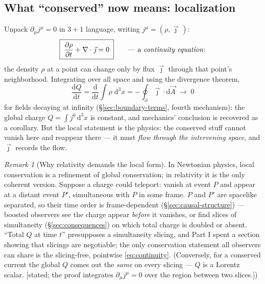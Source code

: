 \documentclass[11pt]{article}
\theoremstyle{plain}
\theoremstyle{definition}
\theoremstyle{remark}
\newtheorem{remark}[theorem]{Remark}
\newcommand{\dd}{\mathrm{d}}
\newcommand{\pd}[2]{\frac{\partial #1}{\partial #2}}
\newcommand{\tot}[2]{\frac{\dd #1}{\dd #2}}
\begin{document}
\subsection{What ``conserved'' now means: localization}
\label{sec:localization}

Unpack $\partial_\mu j^\mu = 0$ in $3{+}1$ language, writing
$j^\mu = (\rho, \vec\jmath\,)$:
\begin{equation}
  \boxed{\;
  \pd{\rho}{t} + \nabla\cdot\vec\jmath = 0
  \;}
  \qquad\text{--- a \emph{continuity equation}:}
  \label{eq:continuity}
\end{equation}
the density $\rho$ at a point can change only by flux $\vec\jmath$
through that point's neighborhood. Integrating over all space and
using the divergence theorem,
\begin{equation}
  \tot{Q}{t}
  = \tot{}{t}\int \rho\;\dd^3x
  = -\oint_{\partial} \vec\jmath \cdot \dd\vec A
  \;\longrightarrow\; 0
\end{equation}
for fields decaying at infinity (\S\ref{sec:boundary-terms}, fourth
mechanism): the global charge $Q = \int j^0\,\dd^3x$ is constant, and
mechanics' conclusion is recovered as a corollary. But the local
statement is the physics: the conserved stuff cannot vanish here and
reappear there --- it must \emph{flow through the intervening space},
and $\vec\jmath$ records the flow.

\begin{remark}[Why relativity demands the local form]
\label{rem:relativity-demands-local}
In Newtonian physics, local conservation is a refinement of global
conservation; in relativity it is the only coherent version. Suppose a
charge could teleport: vanish at event $P$ and appear at a distant
event $P'$, simultaneous with $P$ in some frame. $P$ and $P'$ are
spacelike separated, so their time order is frame-dependent
(\S\ref{sec:causal-structure}) --- boosted observers see the charge
appear \emph{before} it vanishes, or find slices of simultaneity
(\S\ref{sec:consequences}) on which total charge is doubled or absent.
``Total $Q$ at time $t$'' presupposes a simultaneity slicing, and
Part I spent a section showing that slicings are negotiable; the only
conservation statement all observers can share is the slicing-free,
pointwise \eqref{eq:continuity}. (Conversely, for a conserved current
the global $Q$ comes out the \emph{same} on every slicing --- $Q$ is
a Lorentz scalar. [stated; the proof integrates
$\partial_\mu j^\mu = 0$ over the region between two slices.])
\end{remark}
\end{document}

